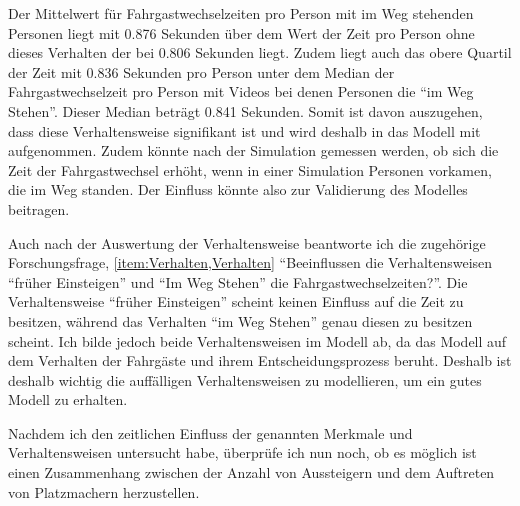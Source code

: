 Der Mittelwert für Fahrgastwechselzeiten pro Person mit im Weg stehenden Personen liegt mit 0.876 Sekunden über dem Wert der Zeit pro Person ohne dieses Verhalten der bei 0.806 Sekunden liegt. Zudem liegt auch das obere Quartil der Zeit mit 0.836 Sekunden pro Person unter dem Median der Fahrgastwechselzeit pro Person mit Videos bei denen Personen die "`im Weg Stehen"'. Dieser Median beträgt 0.841 Sekunden. Somit ist davon auszugehen, dass diese Verhaltensweise signifikant ist und wird deshalb in das Modell mit aufgenommen. Zudem könnte nach der Simulation gemessen werden, ob sich die Zeit der Fahrgastwechsel erhöht, wenn in einer Simulation Personen vorkamen, die im Weg standen. Der Einfluss könnte also zur Validierung des Modelles beitragen.

Auch nach der Auswertung der Verhaltensweise beantworte ich die zugehörige Forschungsfrage, \ref{item:Verhalten,Verhalten} "`Beeinflussen die Verhaltensweisen "`früher Einsteigen"' und "`Im Weg Stehen"' die Fahrgastwechselzeiten?"'. Die Verhaltensweise "`früher Einsteigen"' scheint keinen Einfluss auf die Zeit zu besitzen, während das Verhalten "`im Weg Stehen"' genau diesen zu besitzen scheint. Ich bilde jedoch beide Verhaltensweisen im Modell ab, da das Modell auf dem Verhalten der Fahrgäste und ihrem Entscheidungsprozess beruht. Deshalb ist deshalb wichtig die auffälligen Verhaltensweisen zu modellieren, um ein gutes Modell zu erhalten.

Nachdem ich den zeitlichen Einfluss der genannten Merkmale und Verhaltensweisen untersucht habe, überprüfe ich nun noch, ob es möglich ist einen Zusammenhang zwischen der Anzahl von Aussteigern und dem Auftreten von Platzmachern herzustellen.

